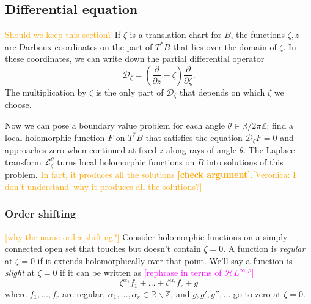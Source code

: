 \documentclass{article}
\newcommand{\Z}{\mathbb{Z}}
\newcommand{\R}{\mathbb{R}}
\newcommand{\holoL}[1]{\mathcal{H}L^{#1}} %
\newcommand{\laplacepde}{\mathcal{D}}
\newcommand{\laplace}{\mathcal{L}}
\begin{document}
\subsection{Differential equation}
\textcolor{orange}{Should we keep this section?}
If $\zeta$ is a translation chart for $B$, the functions $\zeta, z$ are Darboux coordinates on the part of $T^*B$ that lies over the domain of $\zeta$. In these coordinates, we can write down the partial differential operator
\begin{equation}%
\laplacepde_\zeta = \left(\frac{\partial}{\partial z} - \zeta\right) \frac{\partial}{\partial \zeta}.
\end{equation}
The multiplication by $\zeta$ is the only part of $\laplacepde_\zeta$ that depends on which $\zeta$ we choose.

Now we can pose a boundary value problem for each angle $\theta \in \R/2\pi\Z$: find a local holomorphic function $F$ on $T^*B$ that satisfies the equation $\laplacepde_\zeta F = 0$ and approaches zero when continued at fixed $z$ along rays of angle $\theta$.
The Laplace transform $\laplace_\zeta^\theta$ turns local holomorphic functions on $B$ into solutions of this problem. \textcolor{orange}{In fact, it produces all the solutions \textbf{[check argument]}.[Veronica: I don't understand--why it produces all the solutions?]}

\subsubsection{Order shifting}\label{shifting}
\textcolor{orange}{[why the name order shifting?]}
Consider holomorphic functions on a simply connected open set that touches but doesn't contain $\zeta = 0$. A function is {\em regular} at $\zeta = 0$ if it extends holomorphically over that point. We'll say a function is {\em slight} at $\zeta = 0$ if it can be written as \textcolor{magenta}{[rephrase in terms of $\holoL{\infty, \rho}$]}
\begin{equation}\label{eqn:slight-defn}
\zeta^{\alpha_1} f_1 + \ldots + \zeta^{\alpha_r} f_r + g
\end{equation}
where $f_1, \ldots, f_r$ are regular, $\alpha_1, \ldots, \alpha_r \in \R \smallsetminus \Z$, and $g, g', g'', \ldots$ go to zero at $\zeta = 0$.
\end{document}
